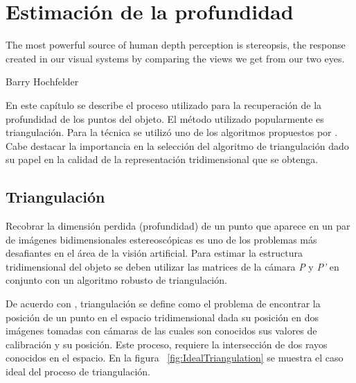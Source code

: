 \chapter{Estimaci\'{o}n de la profundidad}
\label{chap:profundidad}
\epigraph{The most powerful source of human depth perception is stereopsis, the response created in our visual systems by comparing the views we get from our two eyes.}{Barry Hochfelder}

En este cap\'{i}tulo se describe el proceso utilizado para la recuperaci\'{o}n de la profundidad de los puntos del objeto. El m\'{e}todo utilizado popularmente es triangulaci\'{o}n. Para la t\'{e}cnica se utiliz\'{o} uno de los algoritmos propuestos por \cite{hartley1997triangulation}. Cabe destacar la importancia en la selecci\'{o}n del algoritmo de triangulaci\'{o}n dado su papel en la calidad de la representaci\'{o}n tridimensional que se obtenga.

\section{Triangulaci\'{o}n}
Recobrar la dimensi\'{o}n perdida (profundidad) de un punto que aparece en un par de im\'{a}genes bidimensionales estereosc\'{o}picas es uno de los problemas m\'{a}s desafiantes en el \'{a}rea de la visi\'{o}n artificial. Para estimar la estructura tridimensional del objeto se deben utilizar las matrices de la c\'{a}mara \textit{P} y \textit{P'} en conjunto con un algoritmo robusto de triangulaci\'{o}n. %

De acuerdo con \cite{hartley1997triangulation}, triangulaci\'{o}n se define como el problema de encontrar la posici\'{o}n de un punto en el espacio tridimensional dada su posici\'{o}n en dos im\'{a}genes tomadas con c\'{a}maras de las cuales son conocidos sus valores de calibraci\'{o}n y su posici\'{o}n. Este proceso, requiere la intersecci\'{o}n de dos rayos conocidos en el espacio. En la figura ~\ref{fig:IdealTriangulation} se muestra el caso ideal del proceso de triangulaci\'{o}n.

